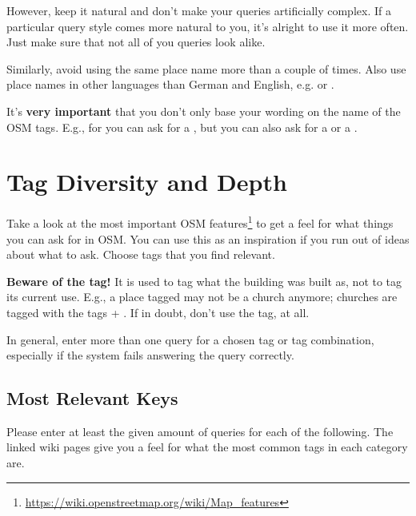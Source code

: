 However, keep it natural and don’t make your queries artificially complex. If a
particular query style comes more natural to you, it’s alright to use it more
often. Just make sure that not all of you queries look alike.

Similarly, avoid using the same place name more than a couple of times. Also use
place names in other languages than German and English, e.g.  or .

It’s \textbf{very important} that you don’t only base your wording on the name
of the OSM tags. E.g., for  you can ask for a
, but you can also ask for a  or a .

\section{Tag Diversity and Depth}

Take a  look at the most important OSM
features\footnote{\url{https://wiki.openstreetmap.org/wiki/Map_features}} to get
a feel for what things you can ask for in OSM. You can use this as an
inspiration if you run out of ideas about what to ask. Choose tags that you find
relevant.

\textbf{Beware of the  tag!} It is used to tag what the
building was built as, not to tag its current use. E.g., a place tagged
 may not be a church anymore; churches are tagged with
the tags  + . If
in doubt, don’t use the  tag, at all.

In general, enter more than one query for a chosen tag or tag combination,
especially if the system fails answering the query correctly.

\subsection{Most Relevant Keys}

Please enter at least the given amount of queries for each of the following. The
linked wiki pages give you a feel for what the most common tags in each category
are.


